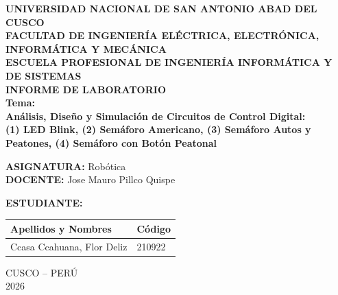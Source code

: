 \documentclass[12pt,a4paper]{article}
\begin{document}
\thispagestyle{empty}

\begin{center}
    \Large \textbf{UNIVERSIDAD NACIONAL DE SAN ANTONIO ABAD DEL CUSCO} \\[0.4cm]
    \large \textbf{FACULTAD DE INGENIERÍA ELÉCTRICA, ELECTRÓNICA, INFORMÁTICA Y MECÁNICA} \\[0.4cm]
    \large \textbf{ESCUELA PROFESIONAL DE INGENIERÍA INFORMÁTICA Y DE SISTEMAS} \\[0.6cm]


    \Huge \textbf{INFORME DE LABORATORIO} \\[0.3cm]
    \LARGE \textbf{Tema:} \\[0.2cm]
    \Large \textbf{Análisis, Diseño y Simulación de Circuitos de Control Digital:} \\
    \large \textbf{(1) LED Blink, (2) Semáforo Americano, (3) Semáforo Autos y Peatones, (4) Semáforo con Botón Peatonal} \\[0.7cm]
\end{center}

\begin{center}
    \Large
    \textbf{ASIGNATURA:} Robótica \\[0.3cm]
    \textbf{DOCENTE:} Jose Mauro Pillco Quispe
\end{center}

\vspace{0.4cm}

\begin{flushleft}
    \Large
    \textbf{ESTUDIANTE:} \\[0.3cm]
    \normalsize
    \begin{tabular}{p{10.5cm}l}
        \textbf{Apellidos y Nombres} & \textbf{Código} \\
        \midrule
        Ccasa Ccahuana, Flor Deliz & 210922 \\
        \bottomrule
    \end{tabular}
\end{flushleft}

\vfill
\begin{center}
    \Large CUSCO -- PERÚ \\
    2026
\end{center}
\end{document}
